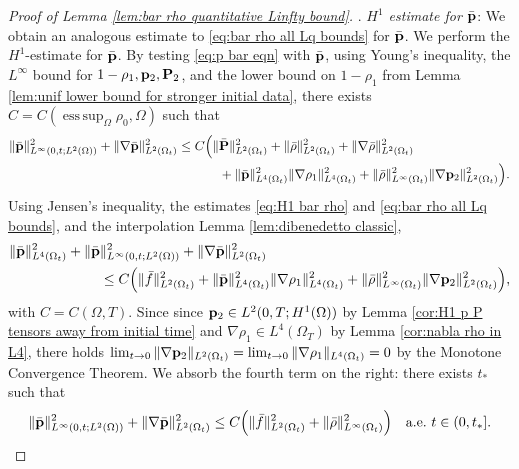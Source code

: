 \documentclass[11pt,a4paper,reqno]{amsart}
\theoremstyle{remark}
\theoremstyle{definition}
\numberwithin{equation}{section}
\DeclareMathOperator{\esssup}{ess \, sup}
\renewcommand{\P}{{\bf P}}
\newcommand{\p}{{\bf p}}
\begin{document}
\begin{proof}[Proof of Lemma \ref{lem:bar rho quantitative Linfty bound}]
. \textit{$H^1$ estimate for $\bar{\p}$}: We obtain an analogous estimate to \eqref{eq:bar rho all Lq bounds} for $\bar{\p}$. We perform the $H^1$-estimate for $\bar{\p}$. By testing \eqref{eq:p bar eqn} with $\bar{\p}$, using Young's inequality, the $L^\infty$ bound for $1-\rho_1,\p_2,\P_2$, and the lower bound on $1-\rho_1$ from Lemma \ref{lem:unif lower bound for stronger initial data}, there exists $C=C(\esssup_\Omega \rho_0,\Omega)$ such that 
\begin{equation*}
    \begin{aligned}
       \Vert \bar{\p} \Vert^2_{L^\infty(0,t;L^2(\Omega))} + \Vert \nabla \bar{\p} \Vert^2_{L^2(\Omega_t)} \leq C \Big( & \Vert \bar{\P} \Vert_{L^2(\Omega_t)}^2 + \Vert \bar{\rho} \Vert_{L^2(\Omega_t)}^2 +  \Vert \nabla \bar{\rho} \Vert_{L^2(\Omega_t)}^2 \\ 
       &\,\,\, + \Vert \bar{\p} \Vert_{L^4(\Omega_t)}^2 \Vert \nabla \rho_1 \Vert_{L^4(\Omega_t)}^2 +  \Vert \bar{\rho} \Vert_{L^\infty(\Omega_t)}^2 \Vert \nabla \p_2 \Vert_{L^2(\Omega_t)}^2 \Big). 
    \end{aligned}
\end{equation*}
Using Jensen's inequality, the estimates \eqref{eq:H1 bar rho} and \eqref{eq:bar rho all Lq bounds}, and the interpolation Lemma \ref{lem:dibenedetto classic}, 
\begin{equation*}
    \begin{aligned}
     \Vert \bar{\p} \Vert^2_{L^4(\Omega_t)} +  \Vert \bar{\p} & \Vert^2_{L^\infty(0,t;L^2(\Omega))} + \Vert \nabla \bar{\p} \Vert^2_{L^2(\Omega_t)} \\ 
     &\leq C \Big( \Vert \bar{f} \Vert_{L^2(\Omega_t)}^2 + \Vert \bar{\p} \Vert_{L^4(\Omega_t)}^2 \Vert \nabla \rho_1 \Vert_{L^4(\Omega_t)}^2 + \Vert \bar{\rho} \Vert_{L^\infty(\Omega_t)}^2 \Vert \nabla \p_2 \Vert_{L^2(\Omega_t)}^2 \Big), 
    \end{aligned}
\end{equation*}
with $C=C(\Omega,T)$. Since since $\p_2 \in L^2(0,T;H^1(\Omega))$ by Lemma \ref{cor:H1 p P tensors away from initial time} and $\nabla \rho_1 \in L^4(\Omega_T)$ by Lemma \ref{cor:nabla rho in L4}, there holds $\lim_{t \to 0} \Vert \nabla \p_2 \Vert_{L^2(\Omega_t)}=\lim_{t \to 0} \Vert \nabla \rho_1 \Vert_{L^4(\Omega_t)} = 0$ by the Monotone Convergence Theorem. We absorb the fourth term on the right: there exists $t_*$ such that 
\begin{equation}\label{eq:H1 bar p}
    \begin{aligned}
          \Vert \bar{\p} \Vert^2_{L^\infty(0,t;L^2(\Omega))} + \Vert \nabla \bar{\p} \Vert^2_{L^2(\Omega_t)} \leq C \Big( \Vert \bar{f} \Vert_{L^2(\Omega_t)}^2 + \Vert \bar{\rho} \Vert_{L^\infty(\Omega_t)}^2 \Big) \quad \text{a.e.~}t \in (0,t_*].

\end{aligned}
\end{equation}
\end{proof}
\end{document}
